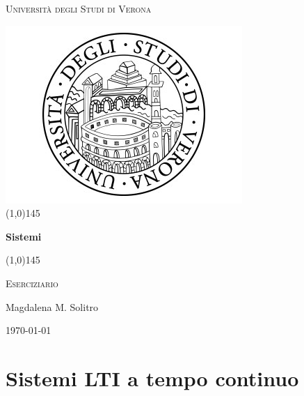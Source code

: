 \documentclass[12pt,a4paper]{article}
\begin{document}
	\begin{titlepage}
		\centering
		\vspace*{\fill}
		{\scshape\LARGE Università degli Studi di Verona \par}
		\vspace{1.5cm}
		\includegraphics[scale=0.5]{./images/univr_logo.png}
		\vspace{1.5cm}\\
		\line(1,0){145} \\
		{\huge\bfseries Sistemi\par}
		\line(1,0){145} \\
		\vspace{0.5cm}
		{\scshape\Large Eserciziario\par}
		\vspace{2cm}
		{\Large Magdalena M. Solitro\par}
		\vspace{1cm}
		
		\vspace{5cm}
		\vspace*{\fill}
		{}
		{\large \today\par}
	\end{titlepage}
	\thispagestyle{empty}
	
	\section*{Sistemi LTI a tempo continuo}
\end{document}
